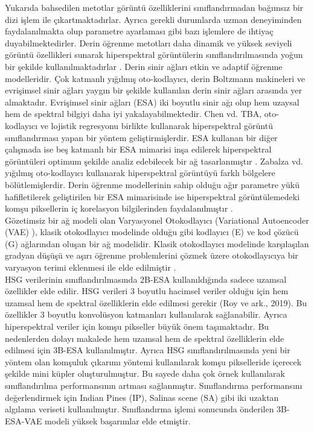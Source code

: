 Yukarıda bahsedilen metotlar görüntü özelliklerini
sınıflandırmadan bağımsız bir dizi işlem ile
çıkartmaktadırlar. Ayrıca gerekli durumlarda uzman
deneyiminden faydalanılmakta olup parametre ayarlaması
gibi bazı işlemlere de ihtiyaç duyabilmektedirler. Derin
öğrenme metotları daha dinamik ve yüksek seviyeli görüntü
özellikleri sunarak hiperspektral görüntülerin
sınıflandırılmasında yoğun bir şekilde kullanılmaktadırlar
\cite{li2017hyperspectral, yu2017convolutional}. Derin sinir ağları etkin ve adaptif öğrenme
modelleridir. Çok katmanlı yığılmış oto-kodlayıcı, derin
Boltzmann makineleri ve evrişimsel sinir ağları yaygın bir
şekilde kullanılan derin sinir ağları arasında yer almaktadır.
Evrişimsel sinir ağları (ESA) iki boyutlu sinir ağı olup hem
uzaysal hem de spektral bilgiyi daha iyi
yakalayabilmektedir. Chen vd. \cite{chen2014deep} TBA, oto-kodlayıcı ve
lojistik regresyonu birlikte kullanarak hiperspektral görüntü
sınıflandırması yapan bir yöntem geliştirmişlerdir. ESA
kullanan bir diğer çalışmada ise beş katmanlı bir ESA
mimarisi inşa edilerek hiperspektral görüntüleri optimum
şekilde analiz edebilecek bir ağ tasarlanmıştır \cite{hu2015deep}. Zabalza
vd. \cite{zabalza2016novel} yığılmış oto-kodlayıcı kullanarak hiperspektral
görüntüyü farklı bölgelere bölütlemişlerdir. Derin öğrenme
modellerinin sahip olduğu ağır parametre yükü\\ hafifletilerek
geliştirilen bir ESA mimarisinde ise hiperspektral
görüntülemedeki komşu piksellerin iç korelasyon
bilgilerinden faydalanılmıştır \cite{li2016hyperspectral}. \\

Gözetimsiz bir ağ modeli olan Varyasyonel Otokodlayıcı (Variational Autoencoder (VAE) ), klasik otokodlayıcı
modelinde olduğu gibi kodlayıcı (E) ve kod çözücü (G)
ağlarından oluşan bir ağ modelidir. Klasik otokodlayıcı
modelinde karşılaşılan gradyan düşüşü ve aşırı öğrenme
problemlerini çözmek üzere otokodlayıcıya bir varyasyon
terimi eklenmesi ile elde edilmiştir \cite{kingma2013auto}.\\
\newpage
HSG verilerinin sınıflandırılmasında 2B-ESA kullanıldığında sadece uzamsal özellikler elde edilir. HSG verileri 3 boyutlu
hacimsel veriler olduğu için hem uzamsal hem de spektral özelliklerin elde edilmesi gerekir (Roy ve ark., 2019). Bu özellikler 3
boyutlu konvolüsyon katmanları kullanılarak sağlanabilir. Ayrıca hiperspektral veriler için komşu pikseller büyük önem taşımaktadır.
Bu nedenlerden dolayı makalede hem uzamsal hem de spektral özelliklerin elde edilmesi için 3B-ESA kullanılmıştır. Ayrıca HSG
sınıflandırılmasında yeni bir yöntem olan komşuluk çıkarımı yöntemi kullanılarak komşu pikselleride içerecek şekilde mini küpler
oluşturulmuştur. Bu sayede daha çok örnek kullanılarak sınıflandırılma performansının artması sağlanmıştır. Sınıflandırma
performansını değerlendirmek için Indian Pines (IP), Salinas scene (SA) gibi iki uzaktan algılama veriseti
kullanılmıştır. Sınıflandırma işlemi sonucunda önderilen 3B-ESA-VAE modeli yüksek başarımlar elde etmiştir.
